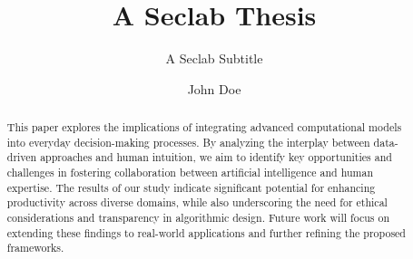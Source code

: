 \documentclass[italian,master]{unibg}
\title{A Seclab Thesis}
\subtitle{A Seclab Subtitle}
\author{John Doe}
\begin{document}
\maketitle
\emptypage

\begin{abstract}
    This paper explores the implications of integrating advanced computational models into everyday decision-making processes. By analyzing the interplay between data-driven approaches and human intuition, we aim to identify key opportunities and challenges in fostering collaboration between artificial intelligence and human expertise. The results of our study indicate significant potential for enhancing productivity across diverse domains, while also underscoring the need for ethical considerations and transparency in algorithmic design. Future work will focus on extending these findings to real-world applications and further refining the proposed frameworks.
\end{abstract}

\emptypage
\toc
\listoffigures
\listoftables
\emptypage

\clearpage
{}






\nocite{*}
\printbibliography[heading=bibintoc]
\end{document}
